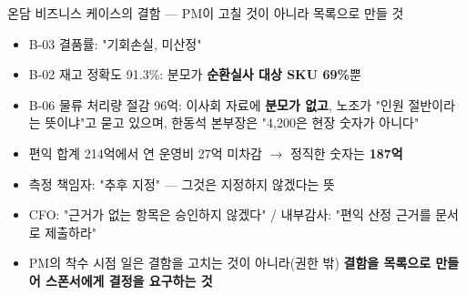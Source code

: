 \begin{frame}[allowframebreaks=1.0]{온담 비즈니스 케이스의 결함 — PM이 고칠 것이 아니라 목록으로 만들 것}
\small
\begin{itemize}
\item\relax B-03 결품률: "기회손실, 미산정"
\item\relax B-02 재고 정확도 91.3\%: 분모가 \textbf{순환실사 대상 SKU 69\%}뿐
\item\relax B-06 물류 처리량 절감 96억: 이사회 자료에 \textbf{분모가 없고}, 노조가 "인원 절반이라는 뜻이냐"고 묻고 있으며, 한동석 본부장은 "4,200은 현장 숫자가 아니다"
\item\relax 편익 합계 214억에서 연 운영비 27억 미차감 $\rightarrow$ 정직한 숫자는 \textbf{187억}
\item\relax 측정 책임자: "추후 지정" — 그것은 지정하지 않겠다는 뜻
\item\relax CFO: "근거가 없는 항목은 승인하지 않겠다" / 내부감사: "편익 산정 근거를 문서로 제출하라"
\item\relax PM의 착수 시점 일은 결함을 고치는 것이 아니라(권한 밖) \textbf{결함을 목록으로 만들어 스폰서에게 결정을 요구하는 것}
\end{itemize}
\end{frame}

